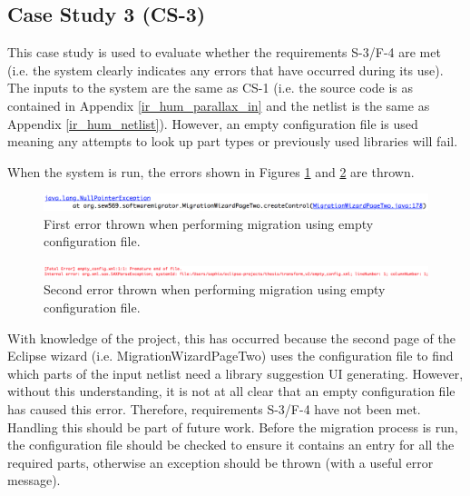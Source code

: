 \documentclass{UoYCSproject}
\begin{document}
\subsection{Case Study 3 (CS-3)} \label{cs3}
This case study is used to evaluate whether the requirements S-3/F-4 are met (i.e. the system clearly indicates any errors that have occurred during its use). The inputs to the system are the same as CS-1 (i.e. the source code is as contained in Appendix \ref{ir_hum_parallax_in} and the netlist is the same as Appendix \ref{ir_hum_netlist}). However, an empty configuration file is used meaning any attempts to look up part types or previously used libraries will fail. 

When the system is run, the errors shown in Figures \ref{fig:cs3_output_1} and \ref{fig:cs3_output_2} are thrown. 
\begin{figure}[h!]
  \centering
  \includegraphics[width=1\linewidth]{graphics/cs3_output_1.png}
  \caption{First error thrown when performing migration using empty configuration file.}
  \label{fig:cs3_output_1}
\end{figure}
\begin{figure}[h!]
  \centering
  \includegraphics[width=1\linewidth]{graphics/cs3_output_2.png}
  \caption{Second error thrown when performing migration using empty configuration file.}
  \label{fig:cs3_output_2}
\end{figure}

With knowledge of the project, this has occurred because the second page of the Eclipse wizard (i.e. MigrationWizardPageTwo) uses the configuration file to find which parts of the input netlist need a library suggestion UI generating. However, without this understanding, it is not at all clear that an empty configuration file has caused this error. Therefore, requirements S-3/F-4 have not been met. Handling this should be part of future work. Before the migration process is run, the configuration file should be checked to ensure it contains an entry for all the required parts, otherwise an exception should be thrown (with a useful error message).
\end{document}

